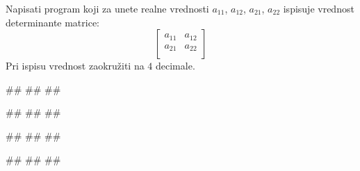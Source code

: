 \begin{Exercise}[label=UZ_NI_20]
Napisati program koji za unete realne vrednosti $a_{11}$, $a_{12}$, $a_{21}$, $a_{22}$  ispisuje vrednost determinante matrice:
\[
 \begin{bmatrix}
  a_{11} & a_{12} \\
  a_{21} & a_{22} \\
 \end{bmatrix}
\]
Pri ispisu vrednost zaokružiti na $4$ decimale.

\begin{miditest}
\begin{upotreba}{1}
#\naslovInt#
##
##
\end{upotreba}
\end{miditest}
\begin{miditest}
\begin{upotreba}{2}
#\naslovInt#
##
##
\end{upotreba}
\end{miditest}

\begin{miditest}
\begin{upotreba}{3}
#\naslovInt#
##
##
\end{upotreba}
\end{miditest}
\begin{miditest}
\begin{upotreba}{4}
#\naslovInt#
##
##
\end{upotreba}
\end{miditest}
\end{Exercise}
\ifresenja
\begin{Answer}[ref=UZ_NI_20]
\end{Answer}
\fi


